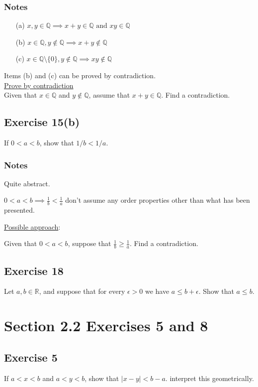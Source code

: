 \documentclass[12pt]{article}
\begin{document}
\begin{flushleft}
\subsubsection*{Notes}
\begin{itemize}
\item[(a)] $x, y \in \mathbb{Q} \implies x + y \in \mathbb{Q} \text{ and } xy \in \mathbb{Q}$
\item[(b)] $x \in \mathbb{Q}, y \notin \mathbb{Q} \implies x + y \notin \mathbb{Q}$
\item[(c)] $x \in \mathbb{Q} \setminus \{0\}, y \notin \mathbb{Q} \implies xy \notin \mathbb{Q}$
\end{itemize}
Items (b) and (c) can be proved by contradiction.\\
\underline{Prove by contradiction}\\
Given that $x \in \mathbb{Q}$ and $y \notin \mathbb{Q}$, assume that $x + y \in \mathbb{Q}$. Find a contradiction.

\subsection*{Exercise 15(b)}
If $0 < a < b$, show that $1/b < 1/a$.

\subsubsection*{Notes}
Quite abstract.

$0 < a < b \implies \frac{1}{b} < \frac{1}{a}$ don't assume any order properties other than what has been presented.

\underline{Possible approach}:

Given that $0 < a < b$, suppose that $\frac{1}{b} \geq \frac{1}{a}$. Find a contradiction.

\subsection*{Exercise 18}
Let $a, b \in \mathbb{R}$, and suppose that for every $\epsilon > 0$ we have $a \leq b + \epsilon$. Show that $a \leq b$.

\section*{Section 2.2 Exercises 5 and 8}

\subsection*{Exercise 5}
If $a < x < b$ and $a < y < b$, show that $\left|x - y\right| < b - a$. interpret this geometrically.


\end{flushleft}
\end{document}
